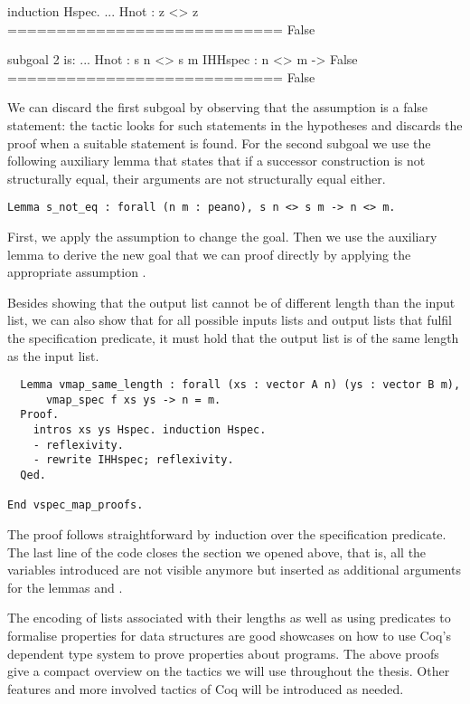 \begin{cproof}{induction Hspec.}
  ...
  Hnot : z <> z
  ============================
  False

subgoal 2 is:
  ...
  Hnot : s n <> s m
  IHHspec : n <> m -> False
  ============================
  False
\end{cproof}

We can discard the first subgoal by observing that the assumption  is a false statement: the tactic  looks for such statements in the hypotheses and discards the proof when a suitable statement is found.
For the second subgoal we use the following auxiliary lemma that states that if a successor construction is not structurally equal, their arguments are not structurally equal either.

\begin{verbatim}
Lemma s_not_eq : forall (n m : peano), s n <> s m -> n <> m.
\end{verbatim}

First, we apply the assumption  to change the goal.
Then we use the auxiliary lemma to derive the new goal  that we can proof directly by applying the appropriate assumption
.

Besides showing that the output list cannot be of different length than the input list, we can also show that for all possible inputs lists  and output lists  that fulfil the specification predicate, it must hold that the output list is of the same length as the input list.

\begin{verbatim}
  Lemma vmap_same_length : forall (xs : vector A n) (ys : vector B m),
      vmap_spec f xs ys -> n = m.
  Proof.
    intros xs ys Hspec. induction Hspec.
    - reflexivity.
    - rewrite IHHspec; reflexivity.
  Qed.

End vspec_map_proofs.
\end{verbatim}

The proof follows straightforward by induction over the specification predicate.
The last line of the code closes the section we opened above, that is, all the variables introduced are not visible anymore but inserted as additional arguments for the lemmas  and .

The encoding of lists associated with their lengths as well as using predicates to formalise properties for data structures are good showcases on how to use Coq's dependent type system to prove properties about programs.
The above proofs give a compact overview on the tactics we will use throughout the thesis.
Other features and more involved tactics of Coq will be introduced as needed.

